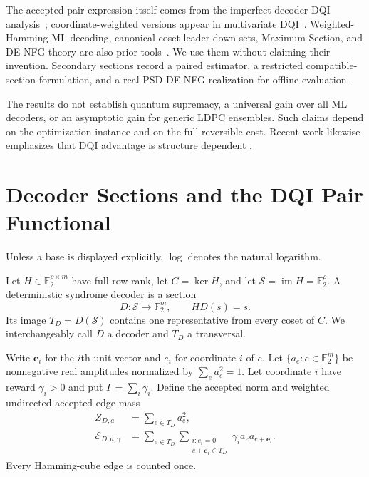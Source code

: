 \documentclass[journal]{IEEEtran}
\theoremstyle{definition}
\theoremstyle{remark}
\newcommand{\F}{\mathbb F}
\newcommand{\im}{\operatorname{im}}
\begin{document}
The accepted-pair expression itself comes from the imperfect-decoder DQI
analysis~\cite{jordan2025dqi}; coordinate-weighted versions appear in
multivariate DQI~\cite{bu2026}.  Weighted-Hamming ML decoding, canonical
coset-leader down-sets, Maximum Section, and DE-NFG theory are also prior
tools~\cite{bitzer2024,grochow2018,cao2017}.  We use them without claiming
their invention.  Secondary sections record a paired estimator, a restricted
compatible-section formulation, and a real-PSD DE-NFG realization for offline
evaluation.

The results do not establish quantum supremacy, a universal gain over all ML
decoders, or an asymptotic gain for generic LDPC ensembles.  Such claims depend
on the optimization instance and on the full reversible cost.  Recent work
likewise emphasizes that DQI advantage is structure dependent
\cite{anschuetz2025,kramer2026}.

\section{Decoder Sections and the DQI Pair Functional}
\label{sec:metric}

Unless a base is displayed explicitly, $\log$ denotes the natural logarithm.

Let $H\in\F_2^{\rho\times m}$ have full row rank, let
$C=\ker H$, and let $\mathcal S=\im H=\F_2^\rho$.  A deterministic syndrome
decoder is a section
\begin{equation}
 D:\mathcal S\longrightarrow\F_2^m,\qquad HD(s)=s.
 \label{eq:section}
\end{equation}
Its image $T_D=D(\mathcal S)$ contains one representative from every coset of
$C$.  We interchangeably call $D$ a decoder and $T_D$ a transversal.

Write $\mathbf e_i$ for the $i$th unit vector and $e_i$ for coordinate $i$ of
$e$.  Let $\{a_e:e\in\F_2^m\}$ be nonnegative real amplitudes normalized by
$\sum_ea_e^2=1$.  Let coordinate $i$ have reward $\gamma_i>0$ and put
$\Gamma=\sum_i\gamma_i$.  Define the accepted norm and weighted undirected
accepted-edge mass
\begin{align}
 Z_{D,a}&=\sum_{e\in T_D}a_e^2,
 \label{eq:radial-Z}\\
 \mathcal E_{D,a,\gamma}
 &=\sum_{e\in T_D}\sum_{\substack{i:e_i=0\\e+\mathbf e_i\in T_D}}
 \gamma_i a_ea_{e+\mathbf e_i}.
 \label{eq:radial-E}
\end{align}
Every Hamming-cube edge is counted once.
\end{document}
